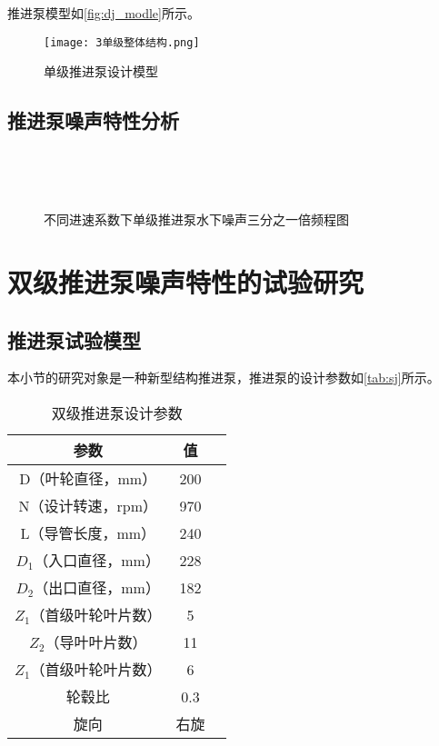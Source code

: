 推进泵模型如\autoref{fig:dj_modle}所示。
\begin{figure}[htbp]
    \centering
    \texttt{[image: 3单级整体结构.png]}
    \caption{\label{fig:dj_modle}单级推进泵设计模型}
\end{figure}

\subsection{推进泵噪声特性分析}
\begin{figure}[htbp]
        \centering
        \vspace{0.02cm}
        \vspace{0.02cm}
\end{figure}
\addtocounter{figure}{-1}
\begin{figure}[htbp]
        \centering
        \addtocounter{figure}{1} 
        \vspace{0.02cm}
        \caption{\label{fig:dj_modle}不同进速系数下单级推进泵水下噪声三分之一倍频程图}
\end{figure}
\section{双级推进泵噪声特性的试验研究}
\subsection{推进泵试验模型}
本小节的研究对象是一种新型结构推进泵，推进泵的设计参数如\autoref{tab:sj}所示。
\begin{table}[htbp]
    \centering
    \caption{\label{tab:sj}双级推进泵设计参数}
    \begin{tabular}{ccc}
     \toprule
     参数&值\\
     \midrule
     D（叶轮直径，mm）&200\\
     N（设计转速，rpm）&970\\
     L（导管长度，mm）&240\\
     $D_1$（入口直径，mm）&228\\
     $D_2$（出口直径，mm）&182\\
     $Z_1$（首级叶轮叶片数）&5\\
     $Z_2$（导叶叶片数）&11\\
     $Z_1$（首级叶轮叶片数）&6\\
     轮毂比&0.3\\
     旋向&右旋\\
     \bottomrule
    \end{tabular}
\end{table}
